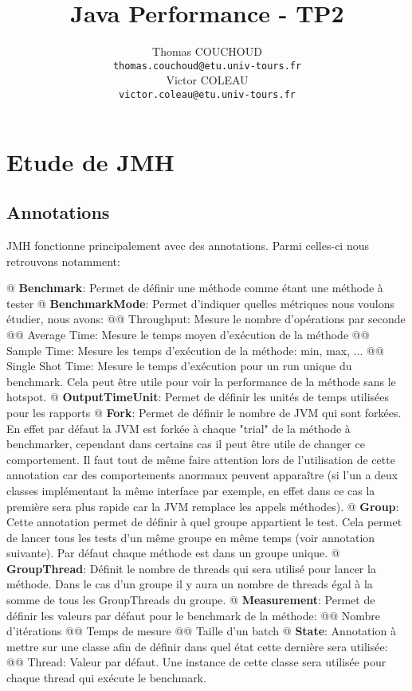 \documentclass{report}
\title{Java Performance - TP2}
\author{Thomas COUCHOUD\\\texttt{thomas.couchoud@etu.univ-tours.fr}\\Victor COLEAU\\\texttt{victor.coleau@etu.univ-tours.fr}}
\begin{document}
	\mccTitle
	
	\chapter{Etude de JMH}
		\section{Annotations}
			JMH fonctionne principalement avec des annotations.
			Parmi celles-ci nous retrouvons notamment:
			\begin{easylist}[itemize]
				@ \textbf{Benchmark}: Permet de définir une méthode comme étant une méthode à tester
				@ \textbf{BenchmarkMode}: Permet d'indiquer quelles métriques nous voulons étudier, nous avons:
				@@ Throughput: Mesure le nombre d'opérations par seconde
				@@ Average Time: Mesure le temps moyen d'exécution de la méthode
				@@ Sample Time: Mesure les temps d'exécution de la méthode: min, max, ...
				@@ Single Shot Time: Mesure le temps d'exécution pour un run unique du benchmark.
				Cela peut être utile pour voir la performance de la méthode sans le hotspot.
				@ \textbf{OutputTimeUnit}: Permet de définir les unités de temps utilisées pour les rapports
				@ \textbf{Fork}: Permet de définir le nombre de JVM qui sont forkées.
				En effet par défaut la JVM est forkée à chaque "trial" de la méthode à benchmarker, cependant dans certains cas il peut être utile de changer ce comportement.
				Il faut tout de même faire attention lors de l'utilisation de cette annotation car des comportements anormaux peuvent apparaître (si l'un a deux classes implémentant la même interface par exemple, en effet dans ce cas la première sera plus rapide car la JVM remplace les appels méthodes).
				@ \textbf{Group}: Cette annotation permet de définir à quel groupe appartient le test.
				Cela permet de lancer tous les tests d'un même groupe en même temps (voir annotation suivante).
				Par défaut chaque méthode est dans un groupe unique.
				@ \textbf{GroupThread}: Définit le nombre de threads qui sera utilisé pour lancer la méthode.
				Dans le cas d'un groupe il y aura un nombre de threads égal à la somme de tous les GroupThreads du groupe.
				@ \textbf{Measurement}: Permet de définir les valeurs par défaut pour le benchmark de la méthode:
				@@ Nombre d'itérations
				@@ Temps de mesure
				@@ Taille d'un batch
				@ \textbf{State}: Annotation à mettre sur une classe afin de définir dans quel état cette dernière sera utilisée:
				@@ Thread: Valeur par défaut. Une instance de cette classe sera utilisée pour chaque thread qui exécute le benchmark.

\end{easylist}
\end{document}
